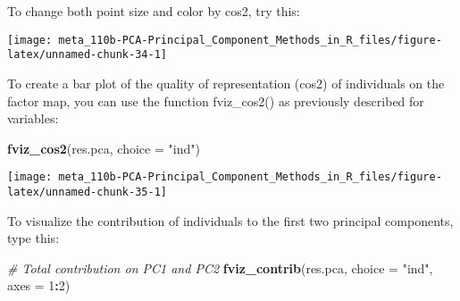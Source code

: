 \documentclass[]{book}
\newenvironment{Shaded}{\begin{snugshade}}{\end{snugshade}}
\newcommand{\CommentTok}[1]{\textcolor[rgb]{0.56,0.35,0.01}{\textit{#1}}}
\newcommand{\DataTypeTok}[1]{\textcolor[rgb]{0.13,0.29,0.53}{#1}}
\newcommand{\DecValTok}[1]{\textcolor[rgb]{0.00,0.00,0.81}{#1}}
\newcommand{\KeywordTok}[1]{\textcolor[rgb]{0.13,0.29,0.53}{\textbf{#1}}}
\newcommand{\NormalTok}[1]{#1}
\newcommand{\OperatorTok}[1]{\textcolor[rgb]{0.81,0.36,0.00}{\textbf{#1}}}
\newcommand{\OtherTok}[1]{\textcolor[rgb]{0.56,0.35,0.01}{#1}}
\newcommand{\StringTok}[1]{\textcolor[rgb]{0.31,0.60,0.02}{#1}}
\begin{document}
To change both point size and color by cos2, try this:

\begin{Shaded}
\end{Shaded}

\begin{center}\texttt{[image: meta\_110b-PCA-Principal\_Component\_Methods\_in\_R\_files/figure-latex/unnamed-chunk-34-1]} \end{center}

To create a bar plot of the quality of representation (cos2) of individuals on the factor map, you can use the function fviz\_cos2() as previously described for variables:

\begin{Shaded}
\begin{Highlighting}[]
\KeywordTok{fviz_cos2}\NormalTok{(res.pca, }\DataTypeTok{choice =} \StringTok{"ind"}\NormalTok{)}
\end{Highlighting}
\end{Shaded}

\begin{center}\texttt{[image: meta\_110b-PCA-Principal\_Component\_Methods\_in\_R\_files/figure-latex/unnamed-chunk-35-1]} \end{center}

To visualize the contribution of individuals to the first two principal components, type this:

\begin{Shaded}
\begin{Highlighting}[]
\CommentTok{# Total contribution on PC1 and PC2}
\KeywordTok{fviz_contrib}\NormalTok{(res.pca, }\DataTypeTok{choice =} \StringTok{"ind"}\NormalTok{, }\DataTypeTok{axes =} \DecValTok{1}\OperatorTok{:}\DecValTok{2}\NormalTok{)}
\end{Highlighting}
\end{Shaded}
\end{document}

